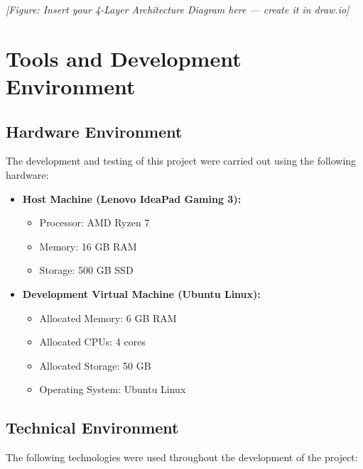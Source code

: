 \textit{[Figure: Insert your 4-Layer Architecture Diagram here — create it in draw.io]}

\section{Tools and Development Environment}

\subsection{Hardware Environment}

The development and testing of this project were carried out using the following hardware:

\begin{itemize}
    \item \textbf{Host Machine (Lenovo IdeaPad Gaming 3):}
    \begin{itemize}
        \item Processor: AMD Ryzen 7
        \item Memory: 16 GB RAM
        \item Storage: 500 GB SSD
    \end{itemize}
    \item \textbf{Development Virtual Machine (Ubuntu Linux):}
    \begin{itemize}
        \item Allocated Memory: 6 GB RAM
        \item Allocated CPUs: 4 cores
        \item Allocated Storage: 50 GB
        \item Operating System: Ubuntu Linux
    \end{itemize}
\end{itemize}

\subsection{Technical Environment}

The following technologies were used throughout the development of the project:

\vspace{0.3cm}


